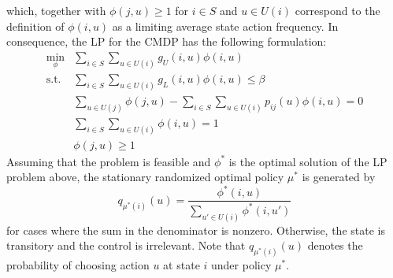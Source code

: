 which, together with $\phi\left(j,u\right) \geq 1$ for $i \in S$ and $u \in U(i)$ correspond to the definition of $\phi\left(i,u\right)$ as a limiting average state action frequency. In consequence, the LP for the CMDP has the following formulation:
\begin{equation}\label{CompleteCMDP}
\begin{array}{ll}
\underset{\phi}\min & \displaystyle\sum_{i\in S}\displaystyle\sum_{u\in U(i)}g_{U}\left(i,u\right)\phi\left(i,u\right) \\
\text{s.t.} & \displaystyle\sum_{i\in S}\displaystyle\sum_{u\in U(i)}g_{L}\left(i,u\right)\phi\left(i,u\right) \leq \beta\\
& \displaystyle\sum_{u\in U(j)}\phi\left(j,u\right) - \displaystyle\sum_{i\in S}\displaystyle\sum_{u\in U(i)}p_{ij}\left(u\right)\phi\left(i,u\right) = 0 \\
& \displaystyle\sum_{i\in S}\displaystyle\sum_{u\in U(i)}\phi\left(i,u\right) = 1\\
& \phi\left(j,u\right) \geq 1
\end{array}
\end{equation}
Assuming that the problem is feasible and $\phi^{*}$ is the optimal solution of the LP problem above, the stationary randomized optimal policy $\mu^{*}$ is generated by
\begin{equation}
q_{\mu^{*}\left(i\right)}\left(u\right)=\displaystyle\frac{\phi^{*}\left(i,u\right)}{\sum_{u' \in U(i)}\phi^{*}\left(i,u'\right)}
\end{equation}
for cases where the sum in the denominator is nonzero. Otherwise, the state is transitory and the control is irrelevant. Note that $q_{\mu^{*}\left(i\right)}\left(u\right)$ denotes the probability of choosing action $u$ at state $i$ under policy $\mu^{*}$.

